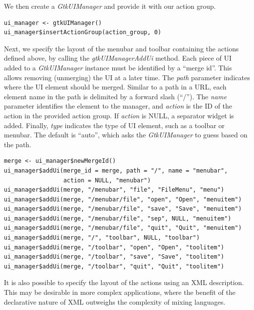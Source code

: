 \documentclass[article]{jss}
\begin{document}
We then create a \emph{GtkUIManager} and provide it with our action group.
\begin{verbatim}
ui_manager <- gtkUIManager()
ui_manager$insertActionGroup(action_group, 0)
\end{verbatim}
Next, we specify
the layout of the menubar and toolbar containing the actions defined
above, by calling the \emph{gtkUIManagerAddUi} method. Each piece of
UI added to a \emph{GtkUIManager} instance must be identified by a
``merge id''. This allows removing (unmerging) the UI at a later time.
The \emph{path} parameter indicates where the UI element should be
merged. Similar to a path in a URL, each element name in the path is
delimited by a forward slash (``/''). The \emph{name} parameter
identifies the element to the manager, and \emph{action} is the ID of
the action in the provided action group. If \emph{action} is NULL, a
separator widget is added. Finally, \emph{type} indicates the type of
UI element, such as a toolbar or menubar. The default is ``auto'',
which asks the \emph{GtkUIManager} to guess based on the path.
\begin{verbatim}
merge <- ui_manager$newMergeId()
ui_manager$addUi(merge_id = merge, path = "/", name = "menubar",
                 action = NULL, "menubar")
ui_manager$addUi(merge, "/menubar", "file", "FileMenu", "menu")
ui_manager$addUi(merge, "/menubar/file", "open", "Open", "menuitem")
ui_manager$addUi(merge, "/menubar/file", "save", "Save", "menuitem")
ui_manager$addUi(merge, "/menubar/file", "sep", NULL, "menuitem")
ui_manager$addUi(merge, "/menubar/file", "quit", "Quit", "menuitem")
ui_manager$addUi(merge, "/", "toolbar", NULL, "toolbar")
ui_manager$addUi(merge, "/toolbar", "open", "Open", "toolitem")
ui_manager$addUi(merge, "/toolbar", "save", "Save", "toolitem")
ui_manager$addUi(merge, "/toolbar", "quit", "Quit", "toolitem")
\end{verbatim}
It is also possible to specify the layout of the actions using an XML
description. This may be desirable in more complex applications, where
the benefit of the declarative nature of XML outweighs the complexity
of mixing languages.
\end{document}
